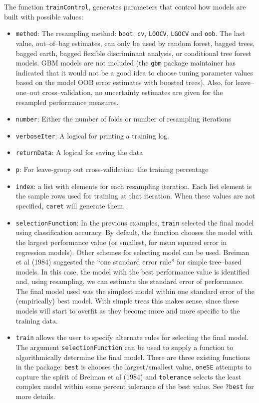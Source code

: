 \documentclass[12pt]{article}
\begin{document}
The function \texttt{trainControl}, generates parameters that control how models are built with possible values:
\begin{itemize}
   \item \texttt{method}: The resampling method: \texttt{boot}, \texttt{cv}, \texttt{LOOCV}, \texttt{LGOCV}  and \texttt{oob}. The last value, out--of--bag estimates, can only be used by random forest, bagged trees, bagged earth, bagged flexible discriminant analysis, or conditional tree forest models. GBM models are not included (the \texttt{gbm} package maintainer has indicated that it would not be a good idea to choose tuning parameter values based on the model OOB error estimates with boosted trees). Also, for leave--one--out cross--validation, no uncertainty estimates are given for the resampled performance measures.
   \item \texttt{number}: Either the number of folds or number of resampling iterations
   \item \texttt{verboseIter}: A logical for printing a training log.
   \item \texttt{returnData}: A logical for saving the data
   \item \texttt{p}: For leave-group out cross-validation: the training percentage
   \item \texttt{index}: a list with elements for each resampling iteration. Each list element is the sample rows used for training at that iteration. When these values are not specified, \texttt{caret} will generate them.
   \item \texttt{selectionFunction}: In the previous examples, \texttt{train} selected the final model using classification accuracy. By default, the function chooses the model with the largest performance value (or smallest, for mean squared error in regression models). Other schemes for selecting model can be used.  Breiman et al (1984) suggested the ``one standard error rule'' for simple tree--based models. In this case, the model with the best performance value is identified and, using resampling, we can estimate the standard error of performance. The final model used was the simplest model within one standard error of the (empirically) best model. With simple trees this makes sense, since these models will start to overfit as they become more and more specific to the training data.
   \item[] \texttt{train} allows the user to specify alternate rules for selecting the final model. The argument \texttt{selectionFunction}  can be used to supply a function to algorithmically determine the final model. There are three existing functions in the package: \texttt{best} is chooses the largest/smallest value, \texttt{oneSE} attempts to capture the spirit of Breiman et al (1984) and \texttt{tolerance} selects the least complex model within some percent tolerance of the best value. See \texttt{?best} for more details.


\end{itemize}
\end{document}
